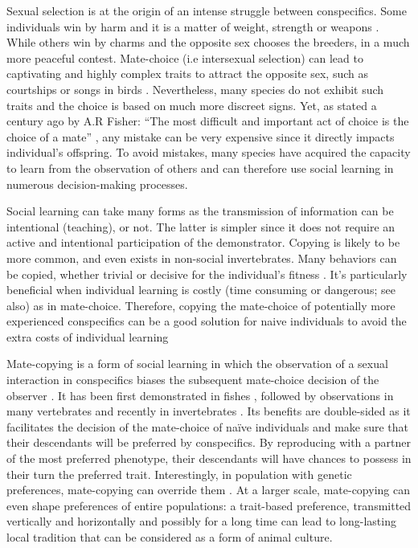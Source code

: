 \documentclass[a4paper, 12pt]{article}
\begin{document}
Sexual selection is at the origin of an intense struggle between conspecifics. Some individuals win by harm and it is a matter of weight, strength or weapons \parencite{anderson_grey_1985, clutton-brock_functions_1982}. While others win by charms and the opposite sex chooses the breeders, in a much more peaceful contest. Mate-choice (i.e intersexual selection) can lead to captivating and highly complex traits to attract the opposite sex, such as courtships or songs in birds \parencite{danchin_ecologie_2005}. Nevertheless, many species do not exhibit such traits and the choice is based on much more discreet signs. Yet, as stated a century ago by A.R Fisher: “The most difficult and important act of choice is the choice of a mate” \parencite{fisher_evolution_1915}, any mistake can be very expensive since it directly impacts individual’s offspring. To avoid mistakes, many species have acquired the capacity to learn from the observation of others and can therefore use social learning in numerous decision-making processes.

Social learning can take many forms as the transmission of information can be
intentional (teaching), or not. The latter is simpler since it does not require an active and intentional participation of the demonstrator. Copying is likely to be more common, and even exists in non-social invertebrates\parencite{coolen_social_2005, laidre_mark_e._how_2010}. Many behaviors can be copied, whether trivial \parencite{van_leeuwen_group-specific_2014}or decisive for the individual’s fitness \parencite{mery_public_2009}. It’s particularly beneficial when individual learning is costly (time consuming or dangerous; see also\parencite{webster_m.m_social_2008}) as in mate-choice. Therefore, copying the mate-choice of potentially more experienced conspecifics can be a good solution for naive individuals to avoid the extra costs of individual learning


Mate-copying is a form of social learning in which the observation of a sexual interaction in conspecifics biases the subsequent mate-choice decision of the observer \parencite{brown_fish_2011}. It has been first demonstrated in fishes \parencite{dugatkin_lee_alan_reversal_1992}, followed by observations in many vertebrates \parencite{galef_mate-choice_1998, yorzinski_same-sex_2010} and recently in invertebrates \parencite{mery_public_2009, fowler-finn_complexities_2015}. Its benefits are double-sided as  it facilitates the decision of the mate-choice of naïve individuals and make sure that their descendants will be preferred by conspecifics. By reproducing with a partner of the most preferred phenotype, their descendants will have chances to possess in their turn the preferred trait.
Interestingly, in population with genetic preferences, mate-copying can override them \parencite{dugatkin_interface_1996, witte_male_1998}. At a larger scale, mate-copying can even shape preferences of entire populations: a trait-based preference, transmitted vertically and horizontally and possibly for a long time can lead to long-lasting local tradition that can be considered as a form of animal culture\parencite{brooks_importance_1998, danchin_cultural_2018}.
\end{document}
